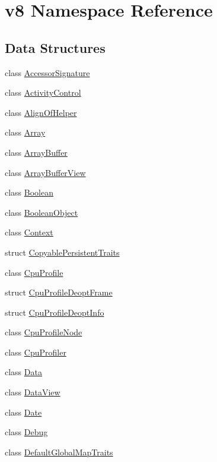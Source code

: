 \hypertarget{namespacev8}{}\section{v8 Namespace Reference}
\label{namespacev8}
\subsection*{Data Structures}
\begin{DoxyCompactItemize}
\item 
class \hyperlink{classv8_1_1AccessorSignature}{Accessor\+Signature}
\item 
class \hyperlink{classv8_1_1ActivityControl}{Activity\+Control}
\item 
class \hyperlink{classv8_1_1AlignOfHelper}{Align\+Of\+Helper}
\item 
class \hyperlink{classv8_1_1Array}{Array}
\item 
class \hyperlink{classv8_1_1ArrayBuffer}{Array\+Buffer}
\item 
class \hyperlink{classv8_1_1ArrayBufferView}{Array\+Buffer\+View}
\item 
class \hyperlink{classv8_1_1Boolean}{Boolean}
\item 
class \hyperlink{classv8_1_1BooleanObject}{Boolean\+Object}
\item 
class \hyperlink{classv8_1_1Context}{Context}
\item 
struct \hyperlink{structv8_1_1CopyablePersistentTraits}{Copyable\+Persistent\+Traits}
\item 
class \hyperlink{classv8_1_1CpuProfile}{Cpu\+Profile}
\item 
struct \hyperlink{structv8_1_1CpuProfileDeoptFrame}{Cpu\+Profile\+Deopt\+Frame}
\item 
struct \hyperlink{structv8_1_1CpuProfileDeoptInfo}{Cpu\+Profile\+Deopt\+Info}
\item 
class \hyperlink{classv8_1_1CpuProfileNode}{Cpu\+Profile\+Node}
\item 
class \hyperlink{classv8_1_1CpuProfiler}{Cpu\+Profiler}
\item 
class \hyperlink{classv8_1_1Data}{Data}
\item 
class \hyperlink{classv8_1_1DataView}{Data\+View}
\item 
class \hyperlink{classv8_1_1Date}{Date}
\item 
class \hyperlink{classv8_1_1Debug}{Debug}
\item 
class \hyperlink{classv8_1_1DefaultGlobalMapTraits}{Default\+Global\+Map\+Traits}

\end{DoxyCompactItemize}
